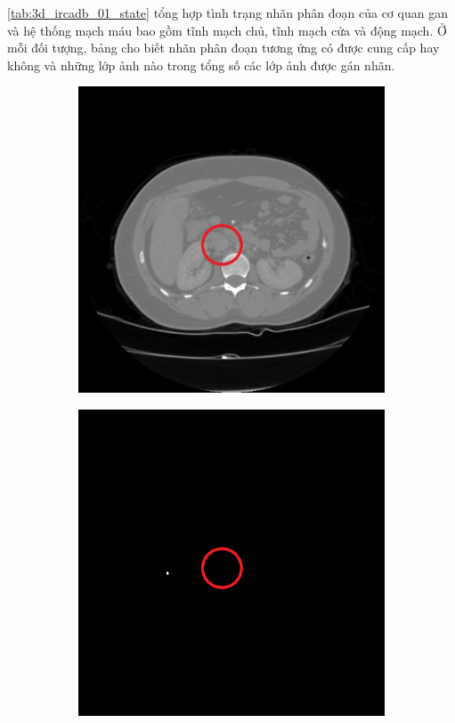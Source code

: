 	\autoref{tab:3d_ircadb_01_state} tổng hợp tình trạng nhãn phân đoạn của cơ quan gan và hệ thống mạch máu bao gồm tĩnh mạch chủ, tĩnh mạch cửa và động mạch. Ở mỗi đối tượng, bảng cho biết nhãn phân đoạn tương ứng có được cung cấp hay không và những lớp ảnh nào trong tổng số các lớp ảnh được gán nhãn.
	\newpage\null\vfill
	\begin{figure}[h!]
		\begin{subfigure}[b]{0.475\textwidth}
			\includegraphics[width=\textwidth]{figures/miss_label_patient_2_dicom_74}
			\caption{}
			\label{fig:miss_label_patient_2_dicom_74}
		\end{subfigure}
		\hfill
		\begin{subfigure}[b]{0.475\textwidth}
			\includegraphics[width=\textwidth]{figures/miss_label_patient_2_mask_74}

\end{subfigure}
\end{figure}
